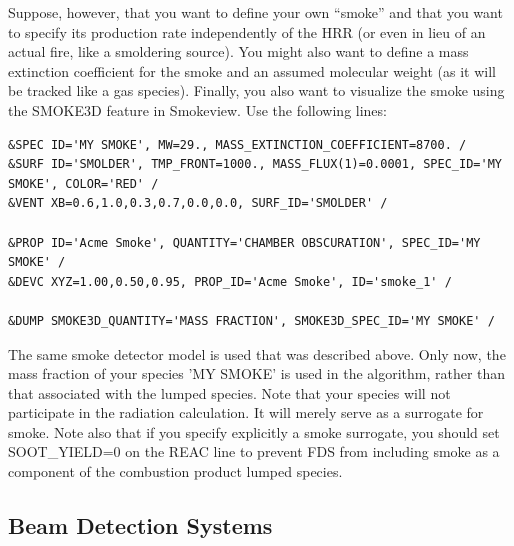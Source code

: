 \documentclass[11pt]{book}
\begin{document}
Suppose, however, that you want to define your own ``smoke'' and that you want to specify its production rate independently of the HRR (or even in lieu of an actual fire, like a smoldering source). You might also want to define a mass extinction coefficient for the smoke and an assumed molecular weight (as it will be tracked like a gas species). Finally, you also want to visualize the smoke using the {\ct SMOKE3D} feature in Smokeview. Use the following lines:
\begin{lstlisting}
&SPEC ID='MY SMOKE', MW=29., MASS_EXTINCTION_COEFFICIENT=8700. /
&SURF ID='SMOLDER', TMP_FRONT=1000., MASS_FLUX(1)=0.0001, SPEC_ID='MY SMOKE', COLOR='RED' /
&VENT XB=0.6,1.0,0.3,0.7,0.0,0.0, SURF_ID='SMOLDER' /

&PROP ID='Acme Smoke', QUANTITY='CHAMBER OBSCURATION', SPEC_ID='MY SMOKE' /
&DEVC XYZ=1.00,0.50,0.95, PROP_ID='Acme Smoke', ID='smoke_1' /

&DUMP SMOKE3D_QUANTITY='MASS FRACTION', SMOKE3D_SPEC_ID='MY SMOKE' /
\end{lstlisting}
The same smoke detector model is used that was described above. Only now, the mass fraction of your species {\ct 'MY SMOKE'} is used in the algorithm, rather than that associated with the lumped species. Note that your species will not participate in the radiation calculation. It will merely serve as a surrogate for smoke. Note also that if you specify explicitly a smoke surrogate, you should set {\ct SOOT\_YIELD=0} on the {\ct REAC} line to prevent FDS from including smoke as a component of the combustion product lumped species.



\subsection{Beam Detection Systems}
\label{info:beam_detector}
\end{document}
